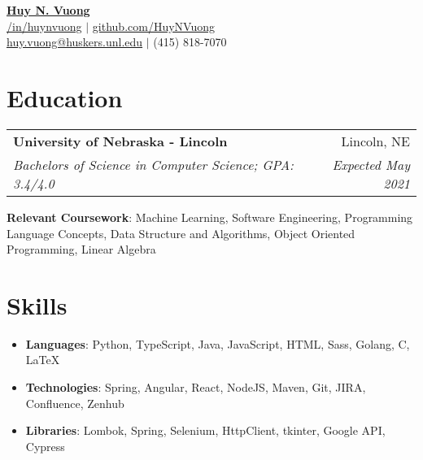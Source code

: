 \documentclass[letterpaper,10pt]{article}
\makeatletter
\newcommand{\resumeItemNoBullet}[2]{
  \item[]\small{
    \hspace{-9pt}\textbf{#1}{: #2 \vspace{-6pt}}
  }
}
\newcommand{\resumeSubheading}[4]{
  \vspace{-1pt}\item[]
  \begin{tabular*}{0.98\textwidth}{l@{\extracolsep{\fill}}r}
      \hspace{-10pt}\textbf{#1} & #2 \\
      \hspace{-10pt}\textit{\small#3} & \textit{\small #4} \\
    \end{tabular*}\vspace{-5pt}
}
\newcommand{\resumeSubHeadingListStart}{\begin{itemize}[leftmargin=*]}
\newcommand{\resumeSubHeadingListEnd}{\end{itemize}}
\newcommand{\shorterSection}[1]{\vspace{-10pt}\section{\textbf{\Large #1}}}
\makeatother
\begin{document}
\begin{center}
  \small \textbf{\href{https://github.com/HuyNVuong}{\huge Huy N. Vuong}} \\
  \vspace{5pt}
   \href{https://www.linkedin.com/in/huynvuong/}{{/in/huynvuong}} $\vert$ 
  \href{https://github.com/HuyNVuong}{github.com/HuyNVuong}\\
  \small \href{mailto:huy.vuong@huskers.unl.edu}{{huy.vuong@huskers.unl.edu}} $\vert$  (415) 818-7070 
\end{center}

\shorterSection{Education}
  \resumeSubHeadingListStart
    \resumeSubheading
      {University of Nebraska - Lincoln}{Lincoln, NE}
      {Bachelors of Science in Computer Science;  GPA: 3.4/4.0}{Expected May 2021}{
      \resumeItemNoBullet{Relevant Coursework}{Machine Learning, Software Engineering, Programming Language Concepts, Data Structure and Algorithms, Object Oriented Programming, Linear Algebra}
    }
  \resumeSubHeadingListEnd
  \vspace{5pt}
\shorterSection{Skills}
  \resumeSubHeadingListStart
  \small
    \item{
     \textbf{Languages}{: Python, TypeScript, Java, JavaScript, HTML, Sass, Golang, C, \LaTeX}
     \hfill
    
    }
    \vspace{-5pt}
    \item{
      \textbf{Technologies}{: Spring, Angular, React, NodeJS, Maven, Git, JIRA, Confluence, Zenhub}
      \hfill
    }
    \vspace{-5pt}
    \item{
      \textbf{Libraries}{: Lombok, Spring, Selenium, HttpClient, tkinter, Google API, Cypress}
      \hfill
    }
\resumeSubHeadingListEnd
\end{document}
